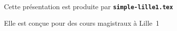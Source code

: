   \item Cette présentation est produite par \texttt{\textbf{simple-lille1.tex}}
  \item Elle est conçue pour des cours magistraux à Lille~1
